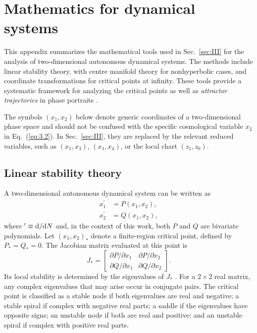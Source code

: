 \documentclass[aps,prd,twocolumn]{revtex4-2}
\newcommand\dx{{\rm d}}
\newcommand\p{\partial}
\begin{document}
\section{Mathematics for dynamical systems}
This appendix summarizes the mathematical tools used in Sec.~\ref{sec:III} for the analysis of two-dimensional autonomous dynamical systems. The methods include linear stability theory, with centre manifold theory for nonhyperbolic cases, and coordinate transformations for critical points at infinity. These tools provide a systematic framework for analyzing the critical points as well as \textit{attractor trajectories} in phase portraits \cite{Bahamonde2018.PhysRep.775.1,Perko2001.book,Meiss2007.book}.

The symbols $(x_1,x_2)$ below denote generic coordinates of a two-dimensional phase space and should not be confused with the specific cosmological variable $x_2$ in Eq.~(\ref{eq:3.2}). In Sec.~\ref{sec:III}, they are replaced by the relevant reduced variables, such as $(x_1,x_3)$, $(x_1,x_4)$, or the local chart $(z_1,z_0)$.

\subsection{Linear stability theory}\label{sec:App.A.1}
A two-dimensional autonomous dynamical system can be written as
\begin{equation}\label{eq:A.01}
\begin{aligned}
  x_1^\prime &= P(x_1,x_2), \\
  x_2^\prime &= Q(x_1,x_2),
\end{aligned}
\end{equation}
where $^\prime\equiv\dx/\dx N$ and, in the context of this work, both $P$ and $Q$ are bivariate polynomials. Let $(x_1,x_2)_\ast$ denote a finite-region critical point, defined by $P_\ast=Q_\ast=0$. The Jacobian matrix evaluated at this point is
\begin{equation}\label{eq:A.02}
  J_\ast =
  \begin{bmatrix}
    \p P/\p x_1  &  \p P/\p x_2 \\
    \p Q/\p x_1  &  \p Q/\p x_2 
  \end{bmatrix}.
\end{equation}
Its local stability is determined by the eigenvalues of $J_\ast$ \cite{Perko2001.book}. For a $2\times2$ real matrix, any complex eigenvalues that may arise occur in conjugate pairs. The critical point is classified as a stable node if both eigenvalues are real and negative; a stable spiral if complex with negative real parts; a saddle if the eigenvalues have opposite signs; an unstable node if both are real and positive; and an unstable spiral if complex with positive real parts. 
\end{document}
